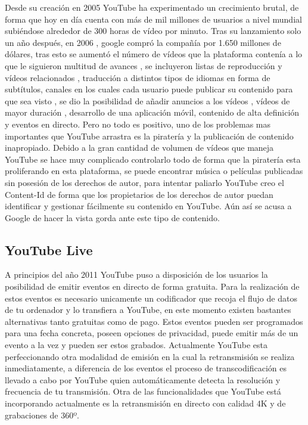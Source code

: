 Desde su creación en 2005 YouTube ha experimentado un crecimiento brutal, de forma que hoy en día cuenta con más de mil millones de usuarios a nivel mundial subiéndose alrededor de 300 horas de vídeo por minuto.
Tras su lanzamiento solo un año después, en 2006 , google compró la compañía por 1.650 millones de dólares, tras esto se aumentó el número de vídeos que la plataforma contenía a lo que le siguieron multitud de avances , se incluyeron listas de reproducción y vídeos relacionados , traducción a distintos tipos de idiomas en forma de subtítulos, canales en los cuales cada usuario puede publicar su contenido para que sea visto , se dio la posibilidad de añadir anuncios a los vídeos , vídeos de mayor duración , desarrollo de una aplicación móvil, contenido de alta definición y eventos en directo.
Pero no todo es positivo, uno de los problemas mas importantes que YouTube arrastra es la piratería y la publicación de contenido inapropiado. Debido a la gran cantidad de volumen de vídeos que maneja YouTube se hace muy complicado controlarlo todo de forma que la piratería esta proliferando en esta plataforma, se puede encontrar música o películas publicadas sin posesión de los derechos de autor, para intentar paliarlo YouTube creo el Content-Id de forma que los propietarios de los derechos de autor puedan identificar y gestionar fácilmente su contenido en YouTube. Aún así se acusa a Google de hacer la vista gorda ante este tipo de contenido.

\subsection{YouTube Live}

A principios del año 2011 YouTube puso a disposición de los usuarios la posibilidad de emitir eventos en directo de forma gratuita. Para la realización de estos eventos es necesario unicamente un codificador que recoja el flujo de datos de tu ordenador y lo transfiera a YouTube, en este momento existen bastantes alternativas tanto gratuitas como de pago. Estos eventos pueden ser programados para una fecha concreta, poseen opciones de privacidad, puede emitir más de un evento a la vez y pueden ser estos grabados. 
Actualmente YouTube esta perfeccionando otra modalidad de emisión en la cual la retransmisión se realiza inmediatamente, a diferencia de los eventos el proceso de transcodificación es llevado a cabo por YouTube quien automáticamente detecta la resolución y frecuencia de tu transmisión.
Otra de las funcionalidades que YouTube está incorporando actualmente es la retransmisión en directo con calidad 4K y de grabaciones de 360º.

